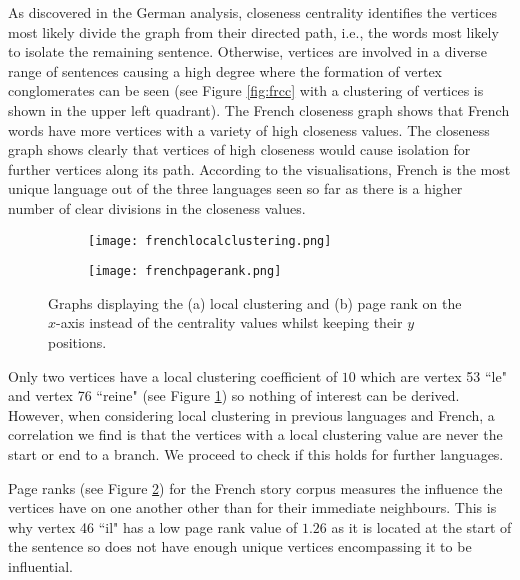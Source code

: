 As discovered in the German analysis, closeness centrality identifies the vertices most likely divide the graph from their directed path, i.e., the words most likely to isolate the remaining sentence. Otherwise, vertices are involved in a diverse range of sentences causing a high degree where the formation of vertex conglomerates can be seen (see Figure \ref{fig:frcc} with a clustering of vertices is shown in the upper left quadrant). The French closeness graph shows that French words have more vertices with a variety of high closeness values. The closeness graph shows clearly that vertices of high closeness would cause isolation for further vertices along its path. According to the visualisations, French is the most unique language out of the three languages seen so far as there is a higher number of clear divisions in the closeness values.

\begin{figure}[!htb]
\centering
\begin{subfigure}{.45\textwidth}
	\hspace{-1cm} 
	\texttt{[image: frenchlocalclustering.png]}
	\caption{}
	\label{fig:frlc}
\end{subfigure}
\hfill
\begin{subfigure}{.45\textwidth}
	\hspace{-1cm} 
	\texttt{[image: frenchpagerank.png]}
	\caption{}
	\label{fig:frpr}
\end{subfigure}
\caption{Graphs displaying the (a) local clustering and (b) page rank on the $x$-axis instead of the centrality values whilst keeping their $y$ positions.}
\label{fig:frother}
\end{figure}

Only two vertices have a local clustering coefficient of $10$ which are vertex 53 ``le" and vertex 76 ``reine" (see Figure \ref{fig:frlc}) so nothing of interest can be derived. However, when considering local clustering in previous languages and French, a correlation we find is that the vertices with a local clustering value are never the start or end to a branch. We proceed to check if this holds for further languages.

Page ranks (see Figure \ref{fig:frpr}) for the French story corpus measures the influence the vertices have on one another other than for their immediate neighbours. This is why vertex 46 ``il" has a low page rank value of $1.26$ as it is located at the start of the sentence so does not have enough unique vertices encompassing it to be influential.

